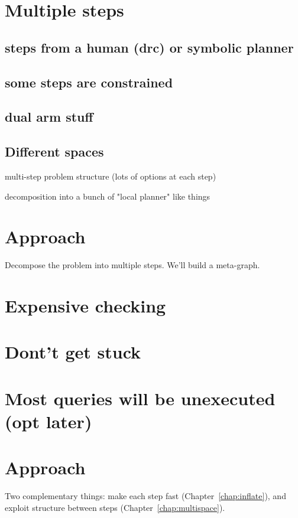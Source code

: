 \documentclass{report}
\begin{document}
\section{Multiple steps}

\subsection{steps from a human (drc) or symbolic planner}
\subsection{some steps are constrained}
\subsection{dual arm stuff}
\subsection{Different spaces}

multi-step problem structure (lots of options at each step)

decomposition into a bunch of "local planner" like things

\section{Approach}

Decompose the problem into multiple steps.
We'll build a meta-graph.

\section{Expensive checking}

\section{Dont't get stuck}

\section{Most queries will be unexecuted (opt later)}

\section{Approach}

Two complementary things:
make each step fast (Chapter~\ref{chap:inflate}),
and exploit structure between steps (Chapter~\ref{chap:multispace}).
\end{document}
